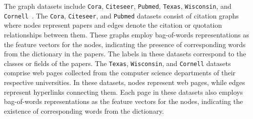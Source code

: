 \documentclass[review]{elsarticle}
\begin{document}
The graph datasets include \texttt{Cora}, \texttt{Citeseer}, \texttt{Pubmed}, \texttt{Texas}, \texttt{Wisconsin}, and \texttt{Cornell}~\cite{pei2020geom}. The \texttt{Cora}, \texttt{Citeseer}, and \texttt{Pubmed} datasets consist of citation graphs where nodes represent papers and edges denote the citation or quotation relationships between them. These graphs employ bag-of-words representations as the feature vectors for the nodes, indicating the presence of corresponding words from the dictionary in the papers. The labels in these datasets correspond to the classes or fields of the papers. The \texttt{Texas}, \texttt{Wisconsin}, and \texttt{Cornell} datasets comprise web pages collected from the computer science departments of their respective universities. In these datasets, nodes represent web pages, while edges represent hyperlinks connecting them. Each page in these datasets also employs bag-of-words representations as the feature vectors for the nodes, indicating the existence of corresponding words from the dictionary.
\end{document}
